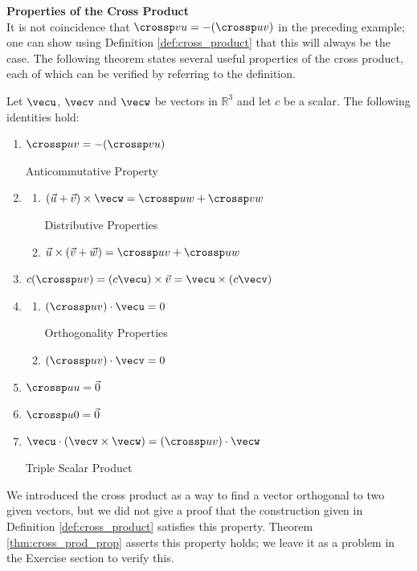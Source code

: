 \noindent\textbf{\large Properties of the Cross Product}\\

It is not coincidence that $\crossp vu = -(\crossp uv)$ in the preceding example; one can show using Definition \ref{def:cross_product} that this will always be the case. The following theorem states several useful properties of the cross product, each of which can be verified by referring to the definition.

\setboxwidth{15pt}
{Let $\vecu$, $\vecv$ and $\vecw$ be vectors in $\mathbb{R}^3$ and let $c$ be a scalar. The following identities hold:
\begin{enumerate}
	\item \parbox{167pt}{$\crossp uv = -(\crossp vu)$} Anticommutative Property
	\item	\begin{enumerate}
		\item \parbox{145pt}{$(\vec u+\vec v)\times \vecw = \crossp uw+\crossp vw$} Distributive Properties
		\item	$\vec u \times (\vec v+\vec w) = \crossp uv+\crossp uw$
	\end{enumerate}
	\item		$c(\crossp uv) = (c\vecu) \times \vec v = \vecu \times (c\vecv)$
	\item		\begin{enumerate}
		\item \parbox{145pt}{$(\crossp uv)\cdot \vecu = 0$} Orthogonality Properties
		\item	$(\crossp uv)\cdot \vecv = 0$
	\end{enumerate}
	\item		$\crossp uu = \vec 0$
	\item		$\crossp u0 = \vec 0$
	\item		\parbox{167pt}{$\vecu \cdot (\vecv\times\vecw) = (\crossp uv)\cdot \vecw$} Triple Scalar Product
\end{enumerate}
}
\restoreboxwidth

We introduced the cross product as a way to find a vector orthogonal to two given vectors, but we did not give a proof that the construction given in Definition \ref{def:cross_product} satisfies this property. Theorem \ref{thm:cross_prod_prop} asserts this property holds; we leave it as a problem in the Exercise section to verify this.

